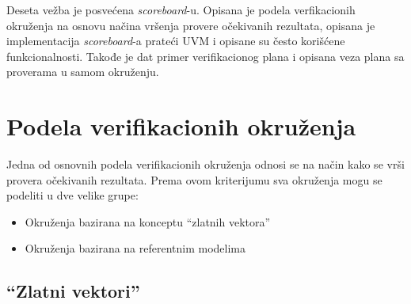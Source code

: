 %
% 

Deseta vežba je posvećena \emph{scoreboard}-u. Opisana je podela verfikacionih
okruženja na osnovu načina vršenja provere očekivanih rezultata, opisana je
implementacija \emph{scoreboard}-a prateći UVM i opisane su često korišćene
funkcionalnosti. Takođe je dat primer verifikacionog plana i opisana veza plana
sa proverama u samom okruženju.


\section{Podela verifikacionih okruženja}

Jedna od osnovnih podela verifikacionih okruženja odnosi se na način kako se
vrši provera očekivanih rezultata. Prema ovom kriterijumu sva okruženja mogu se
podeliti u dve velike grupe:

\begin{itemize}
\item Okruženja bazirana na konceptu ``zlatnih vektora''
\item Okruženja bazirana na referentnim modelima
\end{itemize}


\subsection{``Zlatni vektori''}

